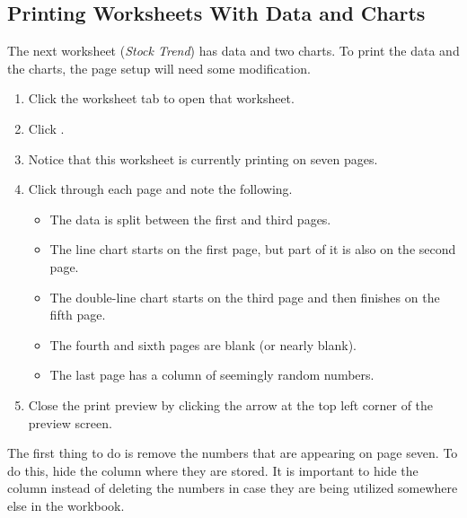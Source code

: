 \subsection{Printing Worksheets With Data and Charts}

The next worksheet (\textit{Stock Trend}) has data and two charts. To print the data and the charts, the page setup will need some modification.

\begin{enumerate}
	\item Click the  worksheet tab to open that worksheet.
	\item Click .
	\item Notice that this worksheet is currently printing on seven pages.
	\item Click through each page and note the following.

	\begin{itemize}
		\item The data is split between the first and third pages.
		\item The line chart starts on the first page, but part of it is also on the second page.
		\item The double-line chart starts on the third page and then finishes on the fifth page.
		\item The fourth and sixth pages are blank (or nearly blank).
		\item The last page has a column of seemingly random numbers.
	\end{itemize}

	\item Close the print preview by clicking the arrow at the top left corner of the preview screen.
\end{enumerate}

The first thing to do is remove the numbers that are appearing on page seven. To do this, hide the column where they are stored. It is important to hide the column instead of deleting the numbers in case they are being utilized somewhere else in the workbook.

